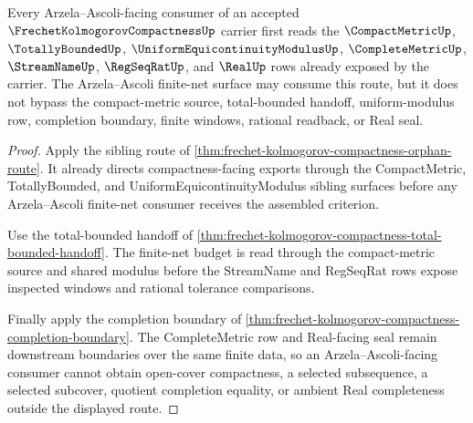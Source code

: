 \begin{theorem}
\label{thm:frechet-kolmogorov-compactness-arzela-ascoli-dependency}
Every Arzela--Ascoli-facing consumer of an accepted $\FrechetKolmogorovCompactnessUp$ carrier first reads the $\CompactMetricUp$, $\TotallyBoundedUp$, $\UniformEquicontinuityModulusUp$, $\CompleteMetricUp$, $\StreamNameUp$, $\RegSeqRatUp$, and $\RealUp$ rows already exposed by the carrier. The Arzela--Ascoli finite-net surface may consume this route, but it does not bypass the compact-metric source, total-bounded handoff, uniform-modulus row, completion boundary, finite windows, rational readback, or Real seal.
\end{theorem}
\begin{proof}
Apply the sibling route of \autoref{thm:frechet-kolmogorov-compactness-orphan-route}. It already directs compactness-facing exports through the CompactMetric, TotallyBounded, and UniformEquicontinuityModulus sibling surfaces before any Arzela--Ascoli finite-net consumer receives the assembled criterion.

Use the total-bounded handoff of \autoref{thm:frechet-kolmogorov-compactness-total-bounded-handoff}. The finite-net budget is read through the compact-metric source and shared modulus before the StreamName and RegSeqRat rows expose inspected windows and rational tolerance comparisons.

Finally apply the completion boundary of \autoref{thm:frechet-kolmogorov-compactness-completion-boundary}. The CompleteMetric row and Real-facing seal remain downstream boundaries over the same finite data, so an Arzela--Ascoli-facing consumer cannot obtain open-cover compactness, a selected subsequence, a selected subcover, quotient completion equality, or ambient Real completeness outside the displayed route.
\end{proof}

